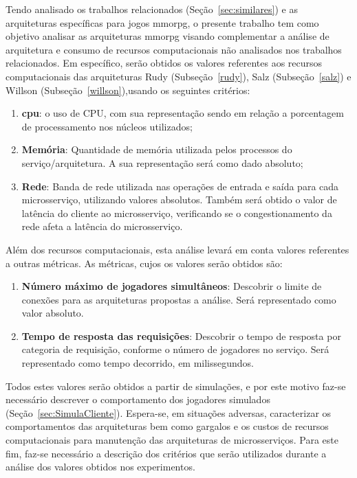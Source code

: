 Tendo analisado os trabalhos relacionados (Seção~\ref{sec:similares}) e as arquiteturas específicas para jogos \ac{mmorpg}, o presente trabalho tem como objetivo analisar as arquiteturas \ac{mmorpg} visando complementar a análise de arquitetura e consumo de recursos computacionais não analisados nos trabalhos relacionados.
%
Em específico, serão obtidos os valores referentes aos recursos computacionais das arquiteturas Rudy (Subseção~\ref{rudy}), Salz (Subseção~\ref{salz}) e Willson (Subseção~\ref{willson}),usando os seguintes critérios:

\begin{enumerate}
  \item \textbf{\ac{cpu}}: o uso de CPU, com sua representação sendo em relação a porcentagem de processamento nos núcleos utilizados;
  \item \textbf{Memória}: Quantidade de memória utilizada pelos processos do serviço/arquitetura. A sua representação será como dado absoluto;
  \item \textbf{Rede}: Banda de rede utilizada nas operações de entrada e saída para cada microsserviço, utilizando valores absolutos. Também será obtido o valor de latência do cliente ao microsserviço, verificando se o congestionamento da rede afeta a latência do microsserviço.
\end{enumerate}

Além dos recursos computacionais, esta análise levará em conta valores referentes a outras métricas.
%
As métricas, cujos os valores serão obtidos são:

\begin{enumerate}
  \item \textbf{Número máximo de jogadores simultâneos}: Descobrir o limite de conexões para as arquiteturas propostas a análise. Será representado como valor absoluto.
  \item \textbf{Tempo de resposta das requisições}: Descobrir o tempo de resposta por categoria de requisição, conforme o número de jogadores no serviço. Será representado como tempo decorrido, em milissegundos.
\end{enumerate}

Todos estes valores serão obtidos a partir de simulações, e por este motivo faz-se necessário descrever o comportamento dos jogadores simulados (Seção~\ref{sec:SimulaCliente}).
%
Espera-se, em situações adversas, caracterizar os comportamentos das arquiteturas bem como gargalos e os custos de recursos computacionais para manutenção das arquiteturas de microsserviços.
%
Para este fim, faz-se necessário a descrição dos critérios que serão utilizados durante a análise dos valores obtidos nos experimentos.

